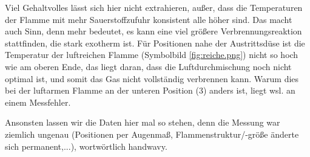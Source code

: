 Viel Gehaltvolles lässt sich hier nicht extrahieren, außer, dass die Temperaturen der Flamme mit mehr Sauerstoffzufuhr konsistent alle höher sind. Das macht auch Sinn, denn mehr  bedeutet, es kann eine viel größere Verbrennungsreaktion stattfinden, die stark exotherm ist. Für Positionen nahe der Austrittsdüse ist die Temperatur der luftreichen Flamme (Symbolbild \cref{fig:reiche.png}) nicht so hoch wie am oberen Ende, das liegt daran, dass die Luftdurchmischung noch nicht optimal ist, und somit das Gas nicht vollständig verbrennen kann. Warum dies bei der luftarmen Flamme an der unteren Position (3) anders ist, liegt wsl. an einem Messfehler. 

Ansonsten lassen wir die Daten hier mal so stehen, denn die Messung war ziemlich ungenau (Positionen per Augenmaß, Flammenstruktur/-größe änderte sich permanent,...), wortwörtlich handwavy. 



